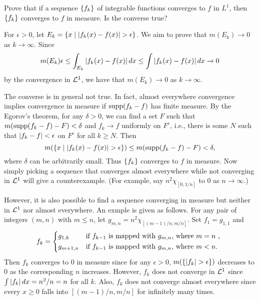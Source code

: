 \begin{problem}
    Prove that if a sequence $\left\{ {f_k} \right\}$ of integrable functions converges to $f$ in $L^1$, then 
    $\left\{ {f_k} \right\}$ converges to $f$ in measure. Is the converse true?
\end{problem}
\begin{pf}
    For $\epsilon > 0$, let $E_k = \left\{ x \;\middle\vert\; \left\lvert {f_k(x) - f(x)} \right\rvert > \epsilon \right\}$. We 
    aim to prove that $m(E_k)\to 0$ as $k\to\infty$. Since 
    \begin{equation*}
        m(E_k)\epsilon \leq \int_{E_k}\left\lvert {f_k(x) - f(x)} \right\rvert dx \leq \int\left\lvert {f_k(x) - f(x)} \right\rvert dx \to 0
    \end{equation*}
    by the convergence in $\mathcal{L}^1$, we have that $m(E_k)\to 0$ as $k\to\infty$. 
    
    The converse is in general not true. In fact, almost everywhere convergence implies 
    convergence in measure if $\supp{f_k-f}$ has finite measure. By the Egorov's theorem, 
    for any $\delta > 0$, we can find a set $F$ such that $m(\supp{f_k-f}-F) < \delta$ and 
    $f_k\to f$ uniformly on $F^c$, i.e., there is some $N$ such that $\left\lvert {f_k-f} \right\rvert<\epsilon$ 
    on $F^c$ for all $k\geq N$. Then 
    \begin{equation*}
        m\pth{\Set{x}{\abs{f_k(x) - f(x)} > \epsilon}} \leq m(\supp{f_k-f}-F) < \delta,
    \end{equation*}
    where $\delta$ can be arbitrarily small. Thus $\left\{ {f_k} \right\}$ converges to $f$ in measure.
    Now simply picking a sequence that converges almost everywhere while not converging in 
    $\mathcal{L}^1$ will give a counterexample. (For example, say $n^2\chi_{[0,1/n]}$ to $0$ as $n\to\infty$.) 
    
    However, it is also possible to find a sequence converging in measure but neither in 
    $\mathcal{L}^1$ nor almost everywhere. An exmple is given as follows. For any pair of integers 
    $(m,n)$ with $m\leq n$, let $g_{m,n} = n^2\chi_{[(m-1)/n,m/n]}$. Set $f_1 = g_{1,1}$ and
    \begin{equation*}
        f_k = \begin{cases*}
            g_{1,k} & if $f_{k-1}$ is mapped with $g_{m,n}$, where $m = n$ , \\
            g_{m+1,n} & if $f_{k-1}$ is mapped with $g_{m,n}$, where $m < n$.
        \end{cases*}
    \end{equation*}
    Then $f_k$ converges to $0$ in measure since for any $\epsilon>0$, $m(\left\{ {\left\lvert {f_k} \right\rvert>\epsilon} \right\})$ 
    decreases to $0$ as the corresponding $n$ increases. However, $f_k$ does not converge in 
    $\mathcal{L}^1$ since $\int\left\lvert {f_k} \right\rvert dx = n^2/n = n$ for all $k$. Also, $f_k$ does not converge almost 
    everywhere since every $x\geq 0$ falls into $[(m-1)/n,m/n]$ for infinitely many times.
\end{pf}

